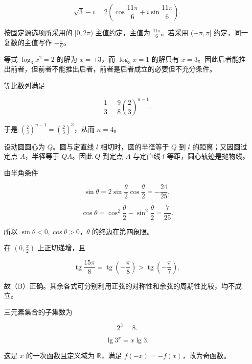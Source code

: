 \begin{answer}
\nopagebreak[4]
\[
\sqrt3-i=2\left(\cos\frac{11\pi}{6}+i\sin\frac{11\pi}{6}\right).
\]

按固定源选项所采用的 $[0,2\pi)$ 主值约定，主值为 $\frac{11\pi}{6}$。若采用 $(-\pi,\pi]$ 约定，同一复数的主值写作 $-\frac\pi6$。


等式 $\log_3x^2=2$ 的解为 $x=\pm3$，而 $\log_3x=1$ 的解只有 $x=3$。因此后者能推出前者，但前者不能推出后者，前者是后者成立的必要但不充分条件。


等比数列满足

\nopagebreak[4]
\[
\frac13=\frac98\left(\frac23\right)^{n-1}.
\]

于是 $\left(\frac23\right)^{n-1}=\left(\frac23\right)^3$，从而 $n=4$。


设动圆圆心为 $Q$。圆与定直线 $l$ 相切时，圆的半径等于 $Q$ 到 $l$ 的距离；又因圆过定点 $A$，半径等于 $QA$。因此 $Q$ 到定点 $A$ 与定直线 $l$ 等距，圆心轨迹是抛物线。


由半角条件

\nopagebreak[4]
\[
\sin\theta=2\sin\frac\theta2\cos\frac\theta2=-\frac{24}{25},
\]

\nopagebreak[4]
\[
\cos\theta=\cos^2\frac\theta2-\sin^2\frac\theta2
=\frac{7}{25}.
\]

所以 $\sin\theta<0,\cos\theta>0$，$\theta$ 的终边在第四象限。


在 $\left(0,\frac\pi2\right)$ 上正切递增，且

\nopagebreak[4]
\[
\operatorname{tg}\frac{15\pi}{8}
=\operatorname{tg}\left(-\frac\pi8\right)
> \operatorname{tg}\left(-\frac\pi7\right),
\]

故（B）正确。其余各式可分别利用正弦的对称性和余弦的周期性比较，均不成立。


三元素集合的子集数为

\nopagebreak[4]
\[
2^3=8.
\]


\nopagebreak[4]
\[
\lg 3^x=x\lg3.
\]

这是 $x$ 的一次函数且定义域为 $\mathbb R$，满足 $f(-x)=-f(x)$，故为奇函数。


\end{answer}
